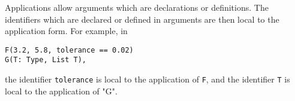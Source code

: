 
Applications allow arguments which are declarations or definitions.
The identifiers which are declared or defined in arguments are then local
to the application form.
For example, in

\begin{small}
\begin{verbatim}
F(3.2, 5.8, tolerance == 0.02)
G(T: Type, List T),
\end{verbatim}
\end{small}

the identifier \verb"tolerance" is local to the application of \verb"F",
and the identifier \verb"T" is local to the application of "G".

